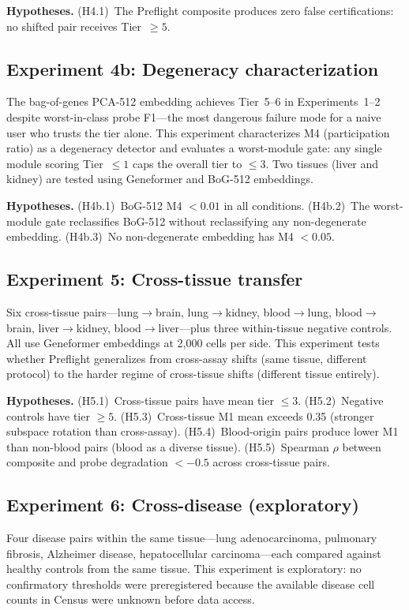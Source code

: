 \documentclass[11pt,letterpaper]{article}
\begin{document}
\textbf{Hypotheses.} (H4.1)~The Preflight composite produces zero false certifications: no shifted pair receives Tier~$\geq 5$.

\subsection{Experiment 4b: Degeneracy characterization}

The bag-of-genes PCA-512 embedding achieves Tier~5--6 in Experiments~1--2 despite worst-in-class probe F1---the most dangerous failure mode for a naive user who trusts the tier alone. This experiment characterizes M4 (participation ratio) as a degeneracy detector and evaluates a worst-module gate: any single module scoring Tier~$\leq 1$ caps the overall tier to $\leq 3$. Two tissues (liver and kidney) are tested using Geneformer and BoG-512 embeddings.

\textbf{Hypotheses.} (H4b.1)~BoG-512 M4 $< 0.01$ in all conditions. (H4b.2)~The worst-module gate reclassifies BoG-512 without reclassifying any non-degenerate embedding. (H4b.3)~No non-degenerate embedding has M4 $< 0.05$.

\subsection{Experiment 5: Cross-tissue transfer}

Six cross-tissue pairs---lung$\to$brain, lung$\to$kidney, blood$\to$lung, blood$\to$brain, liver$\to$kidney, blood$\to$liver---plus three within-tissue negative controls. All use Geneformer embeddings at 2,000 cells per side. This experiment tests whether Preflight generalizes from cross-assay shifts (same tissue, different protocol) to the harder regime of cross-tissue shifts (different tissue entirely).

\textbf{Hypotheses.} (H5.1)~Cross-tissue pairs have mean tier $\leq 3$. (H5.2)~Negative controls have tier $\geq 5$. (H5.3)~Cross-tissue M1 mean exceeds 0.35 (stronger subspace rotation than cross-assay). (H5.4)~Blood-origin pairs produce lower M1 than non-blood pairs (blood as a diverse tissue). (H5.5)~Spearman $\rho$ between composite and probe degradation $< -0.5$ across cross-tissue pairs.

\subsection{Experiment 6: Cross-disease (exploratory)}

Four disease pairs within the same tissue---lung adenocarcinoma, pulmonary fibrosis, Alzheimer disease, hepatocellular carcinoma---each compared against healthy controls from the same tissue. This experiment is exploratory: no confirmatory thresholds were preregistered because the available disease cell counts in Census were unknown before data access.
\end{document}
